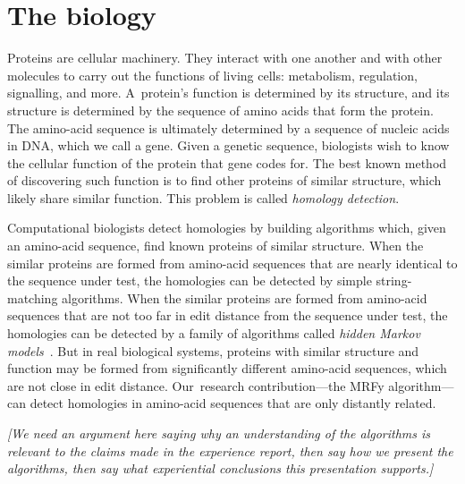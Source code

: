 \documentclass[preprint,nonatbib,blockstyle,nocopyrightspace,times]{sigplanconf}
\let\cite\citep
\begin{document}
\section{The biology}

Proteins are cellular machinery. They interact with one another and with other 
molecules to carry out the functions of living cells: metabolism, regulation, 
signalling, and more.
A~protein's function is determined by its structure, 
and its structure is determined by the sequence of amino acids that
form the protein.
The amino-acid sequence is ultimately determined by a sequence of
nucleic acids in DNA, which we call a gene.
Given a genetic sequence, biologists wish to know the cellular
function of the protein that gene codes for.
The best known method of discovering such function is
to find other proteins of 
similar structure, which likely share similar function.
This problem is called 
\textit{homology detection}.




Computational biologists detect homologies by building 
algorithms which, given an amino-acid sequence,
find known proteins of
similar structure.
When the similar proteins are formed from amino-acid sequences that
are nearly identical to the sequence under test, the homologies can be
detected by  
simple string-matching algorithms.
When the similar proteins are formed from amino-acid sequences that
are not too far in edit distance from the sequence under test, the homologies can be
detected by
a family of algorithms called 
\textit{hidden Markov models}~\cite{hmmer}.
But in real biological systems,
proteins with similar structure and function may be formed from significantly 
different amino-acid sequences, which are not close in edit distance.
Our~research contribution---the MRFy algorithm---can detect homologies
in amino-acid sequences that are only distantly related.
%

\emph{[We need an argument here saying why an understanding of the
    algorithms is relevant to the claims made in the experience
    report, then say how we present the algorithms, then say what
    experiential conclusions this presentation supports.]}
\end{document}
